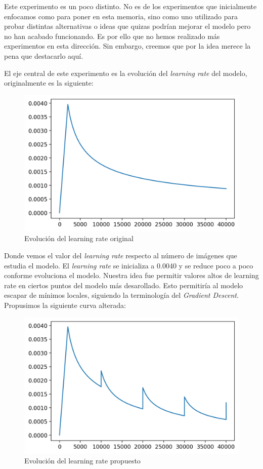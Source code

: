 \documentclass[a4paper, 20pt, dvipsnames]{article}
\begin{document}
Este experimento es un poco distinto. No es de los experimentos que inicialmente
enfocamos como para poner en esta memoria, sino como uno utilizado para probar
distintas alternativas o ideas que quizas podrían mejorar el modelo pero no han
acabado funcionando. Es por ello que no hemos realizado más experimentos en esta
dirección. Sin embargo, creemos que por la idea merece la pena que destacarlo aquí.

El eje central de este experimento es la evolución del \emph{learning rate} del
modelo, originalmente es la siguiente:

\begin{figure}[H]
	\centering
	\includegraphics[scale=0.5]{fig/learning-rate}
	\caption{Evolución del learning rate original}
\end{figure}

Donde vemos el valor del \emph{learning rate} respecto al número de imágenes que
estudia el modelo. El \emph{learning rate} se inicializa a 0.0040 y se reduce poco
a poco conforme evoluciona el modelo. Nuestra idea fue permitir valores altos de
learning rate en ciertos puntos del modelo más desarollado. Esto permitiría al
modelo escapar de mínimos locales, siguiendo la terminología del \emph{Gradient
	Descent}. Propusimos la siguiente curva alterada:

\begin{figure}[H]
	\centering
	\includegraphics[scale=0.5]{fig/learning-rate2}
	\caption{Evolución del learning rate propuesto}
\end{figure}
\end{document}
